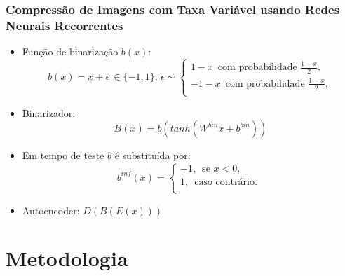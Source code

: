 \documentclass{beamer}
\begin{document}
\begin{frame}
\frametitle{Compressão de Imagens com Taxa Variável usando Redes Neurais Recorrentes~\cite{toderici}}
\begin{itemize}
\item Função de binarização $b(x)$:
\begin{equation} b(x) = x + \epsilon \,\in \{-1, 1\},\, \epsilon \sim \begin{cases} 
1 - x\, \text{ com probabilidade } \frac{1+x}{2},\\
-1 - x\, \text{ com probabilidade } \frac{1-x}{2},\\
\end{cases} \end{equation}
\item Binarizador: \begin{equation} B(x) = b(tanh(W^{bin}x + b^{bin})) \end{equation}
\item Em tempo de teste $b$ é substituída por:
\begin{equation}
b^{inf}(x) = \begin{cases}
-1,\, \text{ se } x < 0,\\
1,\, \text{ caso contrário. }\\
\end{cases}
\end{equation}
\item Autoencoder: $D(B(E(x)))$ 
\end{itemize}
\end{frame}
\section{Metodologia}
\end{document}
